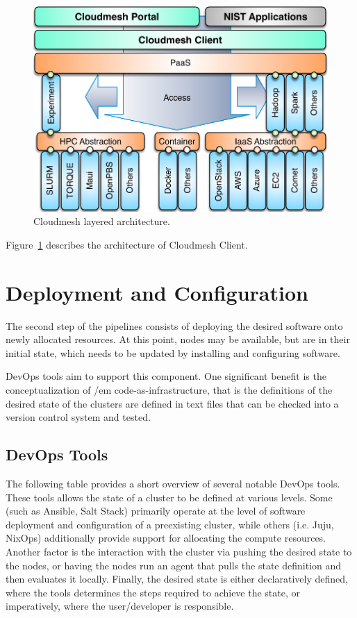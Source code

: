 \documentclass[9pt,twocolumn,twoside]{styles/osajnl}
\begin{document}
\begin{figure}[htb]
  \centering
     \includegraphics[width=1.0\columnwidth]{images/cloudmesh-arch-1.pdf}
  \caption{Cloudmesh layered architecture.} 
  \label{F:cloudmesh-arch}
\end{figure}


Figure~\ref{F:cloudmesh-arch} describes the architecture of Cloudmesh Client.

\section{Deployment and Configuration}

The second step of the pipelines consists of deploying the desired
software onto newly allocated resources. At this point, nodes may be
available, but are in their initial state, which needs to be updated
by installing and configuring software.


DevOps tools aim to support this component. One significant benefit is
the conceptualization of {/em code-as-infrastructure}, that is the
definitions of the desired state of the clusters are defined in text
files that can be checked into a version control system and tested.

\subsection{DevOps Tools}

The following table provides a short overview of several notable
DevOps tools. These tools allows the state of a cluster to be defined
at various levels. Some (such as Ansible, Salt Stack) primarily operate
at the level of software deployment and configuration of a preexisting
cluster, while others (i.e. Juju, NixOps) additionally provide support
for allocating the compute resources. Another factor is the
interaction with the cluster via pushing the desired state to the
nodes, or having the nodes run an agent that pulls the state
definition and then evaluates it locally. Finally, the desired state
is either declaratively defined, where the tools determines the steps
required to achieve the state, or imperatively, where the
user/developer is responsible.
\end{document}
